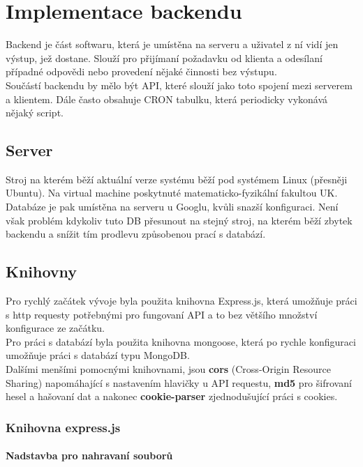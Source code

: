 \chapter{Implementace backendu}
Backend je část softwaru, která je umístěna na serveru a uživatel
z ní vidí jen výstup, jež dostane. Slouží pro přijímaní požadavku od
klienta a odesílaní případné odpovědi nebo provedení nějaké činnosti bez výstupu. 
\\
Součástí backendu by mělo být API, které slouží jako toto spojení mezi
serverem a klientem. Dále často obsahuje CRON tabulku, která periodicky
vykonává nějaký script.

\section{Server}
Stroj na kterém běží aktuální verze systému běží pod systémem Linux (přesněji Ubuntu).
Na virtual machine poskytnuté matematicko-fyzikální fakultou UK.
\\
Databáze je pak umístěna na serveru u Googlu, kvůli snazší konfiguraci.
Není však problém kdykoliv tuto DB přesunout na stejný stroj, na kterém běží
zbytek backendu a snížit tím prodlevu způsobenou prací s databází.


\section{Knihovny}
Pro rychlý začátek vývoje byla použita knihovna Express.js, která
umožňuje práci s http requesty potřebnými pro fungovaní API a to 
bez většího množství konfigurace ze začátku.
\\
Pro práci s databází byla použita knihovna mongoose, která po rychle konfiguraci
umožňuje práci s databází typu MongoDB.
\\
Dalšími menšími pomocnými knihovnami, jsou
\textbf{cors} (Cross-Origin Resource Sharing) napomáhající s nastavením hlavičky u API requestu,
\textbf{md5} pro šifrovaní hesel a hašovaní dat a nakonec
\textbf{cookie-parser} zjednodušující práci s cookies.

\subsection{Knihovna express.js}


\subsubsection{Nadstavba pro nahravaní souborů}

